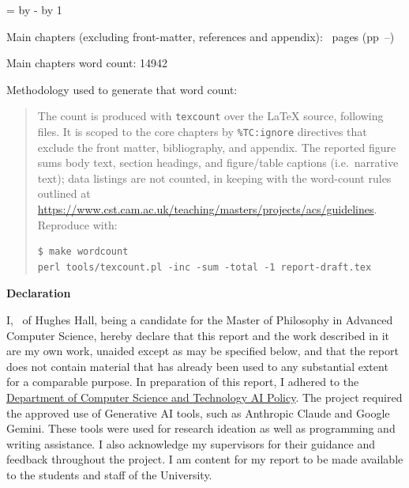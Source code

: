 \documentclass[12pt,a4paper,twoside]{report}
\newif\ifsubmission %
\newcommand{\candidatenumber}{5556G}  %
\newcommand{\college}{Hughes Hall}
\newcommand{\coursefor}{the Master of Philosophy in Advanced Computer Science}
\begin{document}
\begin{sffamily}
\makeatletter
\@tempcnta=\relax%
\advance\@tempcnta by -%
\advance\@tempcnta by 1%
\xdef\contentpages{\the\@tempcnta}%
\makeatother

Main chapters (excluding front-matter, references and appendix):
\contentpages~pages
(pp~\pageref{firstcontentpage}--\pageref{lastcontentpage})

Main chapters word count: 14942

Methodology used to generate that word count:

\begin{quote}
The count is produced with \texttt{texcount} over the \LaTeX{} source, following
\verb|| files. It is scoped to the core chapters by \verb|%TC:ignore|
directives that exclude the front matter, bibliography, and appendix. The
reported figure sums body text, section headings, and figure/table captions
(i.e.\ narrative text); data listings are not counted, in keeping with
the word-count rules outlined at
\url{https://www.cst.cam.ac.uk/teaching/masters/projects/acs/guidelines}. Reproduce with:
\begin{verbatim}
$ make wordcount
perl tools/texcount.pl -inc -sum -total -1 report-draft.tex
\end{verbatim}
\end{quote}

\end{sffamily}

\vspace{\fill}
\onehalfspacing
\textbf{\Huge Declaration}
\vspace{40pt}

I,
\makeatletter\ifsubmission
\candidatenumber,
\else
\@author\ of \college,
\fi\makeatother
being a candidate for \coursefor, hereby declare that this report and
the work described in it are my own work, unaided except as may be
specified below, and that the report does not contain material that
has already been used to any substantial extent for a comparable
purpose.
In preparation of this report, I adhered to the
\href{https://www.cst.cam.ac.uk/files/ai_policy.pdf}{Department of
Computer Science and Technology AI Policy}. The project required
the approved use of Generative AI tools, such as Anthropic Claude and Google Gemini. These tools were used for research ideation as well as programming and writing assistance. I also acknowledge my supervisors for their guidance and feedback throughout the project. I am content for my report to be made available to the students and staff of the University.
\end{document}
